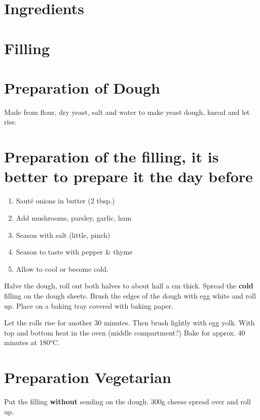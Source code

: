 \section{Ingredients}
  

\section{Filling}


\section{Preparation of Dough}
Made from flour, dry yeast,
salt and water to make yeast dough,
knead and let rise.

\section{Preparation of the filling, it is better to prepare it the day before}
\begin{enumerate}
	\item{Sauté onions in butter (2 tbsp.)}
	\item{Add mushrooms, parsley, garlic, ham}
	\item{Season with salt (little, pinch)}
	\item{Season to taste with pepper \& thyme}
	\item{Allow to cool or become cold.}
\end{enumerate}
Halve the dough, roll out both halves to about half a cm thick.
Spread the \textbf{cold} filling on the dough sheets.
Brush the edges of the dough with egg white and roll up.
Place on a baking tray covered with baking paper.
\begin{flushleft}
	Let the rolls rise for another 30 minutes.
	Then brush lightly with egg yolk.
	With top and bottom heat in the oven (middle compartment?)
	Bake for approx. 40 minutes at 180°C.
\end{flushleft}

\section{Preparation Vegetarian}
Put the filling \textbf{without} sending on the dough. 300g cheese
spread over and roll up.